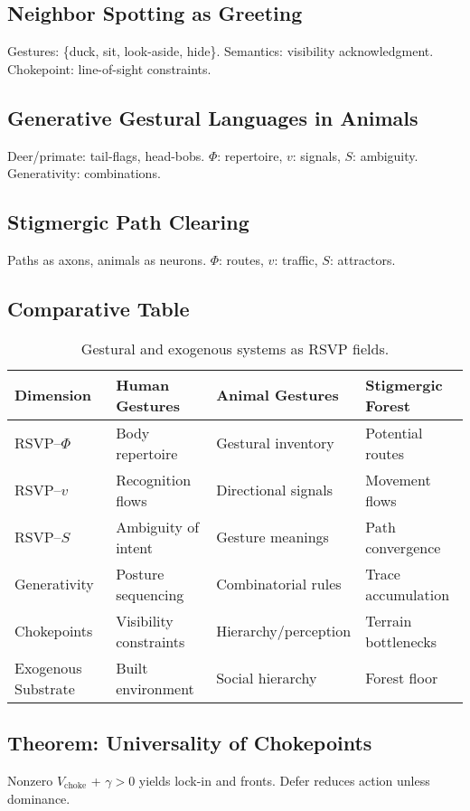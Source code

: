 \documentclass[12pt]{article}
\begin{document}
\subsection{Neighbor Spotting as Greeting}
Gestures: \{duck, sit, look-aside, hide\}. Semantics: visibility acknowledgment. Chokepoint: line-of-sight constraints.

\subsection{Generative Gestural Languages in Animals}
Deer/primate: tail-flags, head-bobs. $\Phi$: repertoire, $v$: signals, $S$: ambiguity. Generativity: combinations.

\subsection{Stigmergic Path Clearing}
Paths as axons, animals as neurons. $\Phi$: routes, $v$: traffic, $S$: attractors.

\subsection{Comparative Table}
\renewcommand{\arraystretch}{1.3}
\begin{table}[h!]
\centering
\begin{tabular}{|l|p{4cm}|p{4cm}|p{4cm}|}
\hline
Dimension & Human Gestures & Animal Gestures & Stigmergic Forest \\
\hline
RSVP--$\Phi$ & Body repertoire & Gestural inventory & Potential routes \\
RSVP--$v$ & Recognition flows & Directional signals & Movement flows \\
RSVP--$S$ & Ambiguity of intent & Gesture meanings & Path convergence \\
Generativity & Posture sequencing & Combinatorial rules & Trace accumulation \\
Chokepoints & Visibility constraints & Hierarchy/perception & Terrain bottlenecks \\
Exogenous Substrate & Built environment & Social hierarchy & Forest floor \\
\hline
\end{tabular}
\caption{Gestural and exogenous systems as RSVP fields.}
\end{table}

\subsection{Theorem: Universality of Chokepoints}
Nonzero $V_{\text{choke}}$ + $\gamma > 0$ yields lock-in and fronts. Defer reduces action unless dominance.

\newpage


\end{document}
